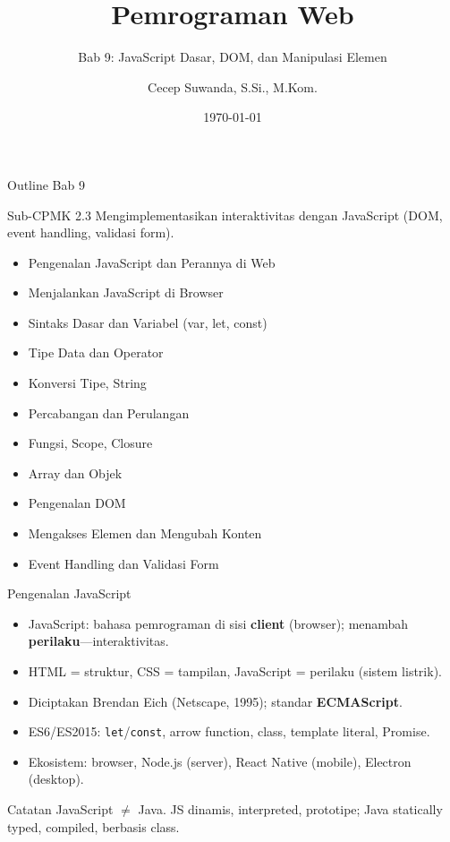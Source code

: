 \documentclass[handout]{beamer}
\title[Bab 9 -- JavaScript \& DOM]{Pemrograman Web}
\subtitle{Bab 9: JavaScript Dasar, DOM, dan Manipulasi Elemen}
\author{Cecep Suwanda, S.Si., M.Kom.}
\institute{Universitas Bale Bandung}
\date{\today}
\begin{document}
\begin{frame}
	\titlepage
\end{frame}

\begin{frame}[shrink=15]{Outline Bab 9}
	\begin{block}{Sub-CPMK 2.3}
		Mengimplementasikan interaktivitas dengan JavaScript (DOM, event handling, validasi form).
	\end{block}
	\begin{itemize}
		\item Pengenalan JavaScript dan Perannya di Web
		\item Menjalankan JavaScript di Browser
		\item Sintaks Dasar dan Variabel (var, let, const)
		\item Tipe Data dan Operator
		\item Konversi Tipe, String
		\item Percabangan dan Perulangan
		\item Fungsi, Scope, Closure
		\item Array dan Objek
		\item Pengenalan DOM
		\item Mengakses Elemen dan Mengubah Konten
		\item Event Handling dan Validasi Form
	\end{itemize}
\end{frame}

\begin{frame}{Pengenalan JavaScript}
	\begin{itemize}
		\item JavaScript: bahasa pemrograman di sisi \textbf{client} (browser); menambah \textbf{perilaku}---interaktivitas.
		\item HTML = struktur, CSS = tampilan, JavaScript = perilaku (sistem listrik).
		\item Diciptakan Brendan Eich (Netscape, 1995); standar \textbf{ECMAScript}.
		\item ES6/ES2015: \texttt{let}/\texttt{const}, arrow function, class, template literal, Promise.
		\item Ekosistem: browser, Node.js (server), React Native (mobile), Electron (desktop).
	\end{itemize}
	\begin{block}{Catatan}
		JavaScript $\neq$ Java. JS dinamis, interpreted, prototipe; Java statically typed, compiled, berbasis class.
	\end{block}
\end{frame}
\end{document}
